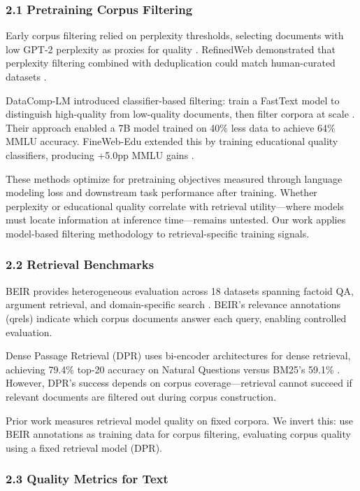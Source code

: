 
\subsubsection{2.1 Pretraining Corpus Filtering}

Early corpus filtering relied on perplexity thresholds, selecting documents with low GPT-2 perplexity as proxies for quality \citep{Wenzek2020}. RefinedWeb demonstrated that perplexity filtering combined with deduplication could match human-curated datasets \citep{Penedo2023}.

DataComp-LM introduced classifier-based filtering: train a FastText model to distinguish high-quality from low-quality documents, then filter corpora at scale \citep{Li2024}. Their approach enabled a 7B model trained on 40\% less data to achieve 64\% MMLU accuracy. FineWeb-Edu extended this by training educational quality classifiers, producing +5.0pp MMLU gains \citep{Penedo2024}.

These methods optimize for pretraining objectives measured through language modeling loss and downstream task performance after training. Whether perplexity or educational quality correlate with retrieval utility---where models must locate information at inference time---remains untested. Our work applies model-based filtering methodology to retrieval-specific training signals.

\subsubsection{2.2 Retrieval Benchmarks}

BEIR provides heterogeneous evaluation across 18 datasets spanning factoid QA, argument retrieval, and domain-specific search \citep{Thakur2021}. BEIR's relevance annotations (qrels) indicate which corpus documents answer each query, enabling controlled evaluation.

Dense Passage Retrieval (DPR) uses bi-encoder architectures for dense retrieval, achieving 79.4\% top-20 accuracy on Natural Questions versus BM25's 59.1\% \citep{Karpukhin2020}. However, DPR's success depends on corpus coverage---retrieval cannot succeed if relevant documents are filtered out during corpus construction.

Prior work measures retrieval model quality on fixed corpora. We invert this: use BEIR annotations as training data for corpus filtering, evaluating corpus quality using a fixed retrieval model (DPR).

\subsubsection{2.3 Quality Metrics for Text}

